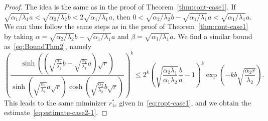 \documentclass[10pt,a4paper]{amsart}
\begin{document}
\begin{proof}
The idea is the same as in the proof of Theorem~\ref{thm:cont-case1}.
If $\sqrt{\alpha_1/\lambda_1} a < \sqrt{\alpha_2/\lambda_2} b < 2\sqrt{\alpha_1/\lambda_1} a$, then $0<\sqrt{\alpha_2/\lambda_2} b - \sqrt{\alpha_1/\lambda_1} a < \sqrt{\alpha_1/\lambda_1} a$. We can thus follow the same steps as in the proof of Theorem~\ref{thm:cont-case1} by taking $\alpha = \sqrt{\alpha_2/\lambda_2} b - \sqrt{\alpha_1/\lambda_1} a$ and $\beta = \sqrt{\alpha_1/\lambda_1} a$.
We find a similar bound as~\eqref{eq:BoundThm2}, namely
\begin{equation}\label{eq:BoundThm3}
	\left(\frac{\sinh\left(\left(\sqrt{\frac{\alpha_2}{\lambda_2}} b - \sqrt{\frac{\alpha_1}{\lambda_1}} a \right) \sqrt{r} \right)}{\sinh\left(\sqrt{\frac{\alpha_1}{\lambda_1}} a \sqrt{r}\right)\cosh\left(\sqrt{\frac{\alpha_2}{\lambda_2}} b \sqrt{r}\right)}\right)^k
	\leq 2^k\left(\sqrt{\frac{\alpha_2 \lambda_1}{\alpha_1\lambda_2}}\frac{b}{a} - 1\right)^k \exp\left(-kb\sqrt{\frac{\alpha_2r}{\lambda_2}}\right).
\end{equation}
This leads to the same miminizer $r^*_{1c}$ given in~\eqref{eq:ropt-case1}, and we obtain the estimate~\eqref{eq:estimate-case2-1}.


\end{proof}
\end{document}
